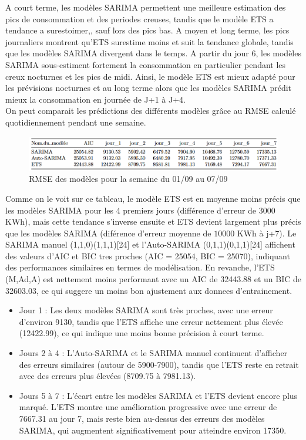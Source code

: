 \documentclass{article}
\theoremstyle{definition}
\theoremstyle{remark}
\begin{document}
A court terme, les modèles SARIMA permettent une meilleure estimation des pics de consommation et des periodes creuses, tandis que le modèle ETS a tendance a surestoimer,, sauf lors des pics bas. A moyen et long terme, les pics journaliers montrent qu’ETS surestime moins et suit la tendance globale, tandis que les modèles SARIMA
divergent dans le temps. A partir du jour 6, les modèles SARIMA sous-estiment fortement la consommation en particulier pendant les creux nocturnes et les pics de midi. \newline
Ainsi, le modèle ETS est mieux adapté pour les prévisions nocturnes et au long terme alors que les modèles SARIMA prédit mieux la consommation en journée de J+1 à J+4.\newline \\
On peut comparait les prédictions des différents modèles grâce au RMSE calculé quotidiennement pendant une semaine. 
\FloatBarrier
\begin{figure}[!h]
    \centering
    \includegraphics[width=1\linewidth]{fig21.png}
    \caption{RMSE des modèles pour la semaine du 01/09 au 07/09}
    \label{fig:enter-label}
\end{figure}
Comme on le voit sur ce tableau, le modèle ETS est en moyenne moins précis que les modèles SARIMA pour les 4 premiers jours (différence d'erreur de $3000$ KWh), mais cette tendance s'inverse ensuite et ETS devient largement plus précis que les modèles SARIMA (diférence d'erreur moyenne de $10000$ KWh à j+7).
Le SARIMA manuel (1,1,0)(1,1,1)[24] et l'Auto-SARIMA (0,1,1)(0,1,1)[24] affichent des valeurs d'AIC et BIC tres proches (AIC = 25054, BIC = 25070), indiquant des performances similaires en termes de modélisation. En revanche, l'ETS (M,Ad,A) est nettement moins performant avec un AIC de 32443.88 et un BIC de 32603.03, ce qui suggere un moins bon ajustement aux donnees d'entrainement.
\begin{itemize}
    \item Jour 1 : Les deux modèles SARIMA sont très proches, avec une erreur d’environ 9130, tandis que l’ETS affiche une erreur nettement plus élevée (12422.99), ce qui indique une moins bonne précision à court terme.
    \item Jours 2 à 4 : L’Auto-SARIMA et le SARIMA manuel continuent d'afficher des erreurs similaires (autour de 5900-7900), tandis que l’ETS reste en retrait avec des erreurs plus élevées (8709.75 à 7981.13).
    \item Jours 5 à 7 : L’écart entre les modèles SARIMA et l’ETS devient encore plus marqué. L’ETS montre une amélioration progressive avec une erreur de 7667.31 au jour 7, mais reste bien au-dessus des erreurs des modèles SARIMA, qui augmentent significativement pour atteindre environ 17350.
\end{itemize}
\end{document}
